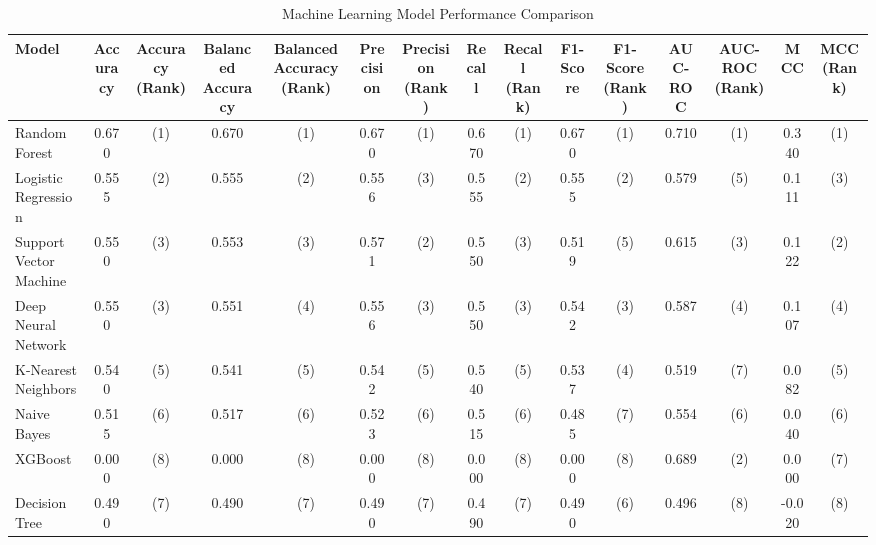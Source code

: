 
\begin{table}[htbp]
\centering
\caption{Machine Learning Model Performance Comparison}
\label{tab:performance}
\begin{tabular}{lcccccccccccccc}
\hline
Model & Accuracy & Accuracy (Rank) & Balanced Accuracy & Balanced Accuracy (Rank) & Precision & Precision (Rank) & Recall & Recall (Rank) & F1-Score & F1-Score (Rank) & AUC-ROC & AUC-ROC (Rank) & MCC & MCC (Rank) \\
\hline
Random Forest & 0.670 & (1) & 0.670 & (1) & 0.670 & (1) & 0.670 & (1) & 0.670 & (1) & 0.710 & (1) & 0.340 & (1) \\
Logistic Regression & 0.555 & (2) & 0.555 & (2) & 0.556 & (3) & 0.555 & (2) & 0.555 & (2) & 0.579 & (5) & 0.111 & (3) \\
Support Vector Machine & 0.550 & (3) & 0.553 & (3) & 0.571 & (2) & 0.550 & (3) & 0.519 & (5) & 0.615 & (3) & 0.122 & (2) \\
Deep Neural Network & 0.550 & (3) & 0.551 & (4) & 0.556 & (3) & 0.550 & (3) & 0.542 & (3) & 0.587 & (4) & 0.107 & (4) \\
K-Nearest Neighbors & 0.540 & (5) & 0.541 & (5) & 0.542 & (5) & 0.540 & (5) & 0.537 & (4) & 0.519 & (7) & 0.082 & (5) \\
Naive Bayes & 0.515 & (6) & 0.517 & (6) & 0.523 & (6) & 0.515 & (6) & 0.485 & (7) & 0.554 & (6) & 0.040 & (6) \\
XGBoost & 0.000 & (8) & 0.000 & (8) & 0.000 & (8) & 0.000 & (8) & 0.000 & (8) & 0.689 & (2) & 0.000 & (7) \\
Decision Tree & 0.490 & (7) & 0.490 & (7) & 0.490 & (7) & 0.490 & (7) & 0.490 & (6) & 0.496 & (8) & -0.020 & (8) \\
\hline
\end{tabular}
\end{table}
